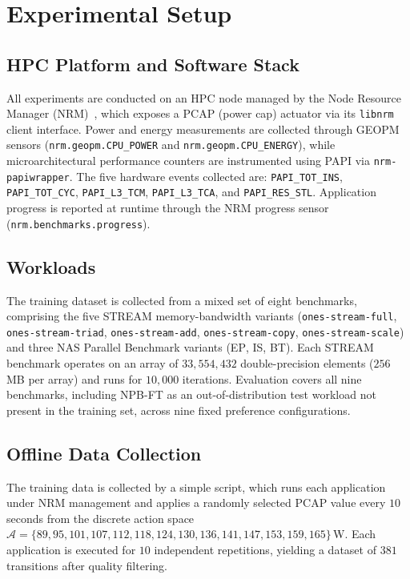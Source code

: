   \section{Experimental Setup}
  \label{sec:experimental_setup}

  \subsection{HPC Platform and Software Stack}

  All experiments are conducted on an HPC node managed by the Node Resource
  Manager (NRM)~\cite{nrm}, which exposes a PCAP (power cap) actuator via its
  \texttt{libnrm} client interface. Power and energy measurements are collected
  through GEOPM sensors (\texttt{nrm.geopm.CPU\_POWER} and
  \texttt{nrm.geopm.CPU\_ENERGY}), while microarchitectural performance counters
  are instrumented using PAPI via \texttt{nrm-papiwrapper}. The five hardware
  events collected are: \texttt{PAPI\_TOT\_INS}, \texttt{PAPI\_TOT\_CYC},
  \texttt{PAPI\_L3\_TCM}, \texttt{PAPI\_L3\_TCA}, and \texttt{PAPI\_RES\_STL}.
  Application progress is reported at runtime through the NRM progress sensor
  (\texttt{nrm.benchmarks.progress}).

  \subsection{Workloads}

  The training dataset is collected from a mixed set of eight benchmarks,
  comprising the five STREAM memory-bandwidth variants (\texttt{ones-stream-full},
  \texttt{ones-stream-triad}, \texttt{ones-stream-add}, \texttt{ones-stream-copy},
  \texttt{ones-stream-scale}) and three NAS Parallel Benchmark variants
  (\textsc{EP}, \textsc{IS}, \textsc{BT}). Each STREAM benchmark operates on an
  array of $33{,}554{,}432$ double-precision elements ($256$\,MB per array) and
  runs for $10{,}000$ iterations. Evaluation covers all nine benchmarks, including
  NPB-FT as an out-of-distribution test workload not present in the training set,
  across nine fixed preference configurations.

  \subsection{Offline Data Collection}
  \label{sec:data_collection}

  The training data is collected by a simple script, which runs each
  application under NRM management and applies a randomly selected PCAP value
  every $10$ seconds from the discrete action space
  $\mathcal{A} = \{89, 95, 101, 107, 112, 118, 124, 130, 136, 141, 147, 153,
  159, 165\}$\,W. Each application is executed for $10$ independent repetitions,
  yielding a dataset of $381$ transitions after quality filtering.

